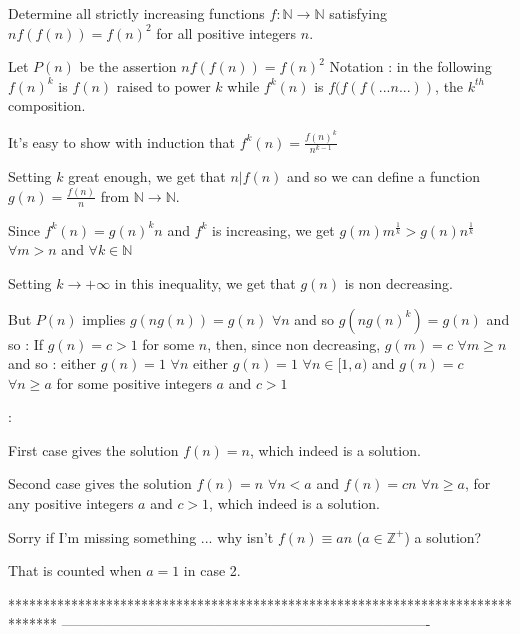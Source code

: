 \begin{solution}
	\begin{tcolorbox}Determine all strictly increasing functions $f: \mathbb{N}\to\mathbb{N}$ satisfying $nf(f(n))=f(n)^2$ for all positive integers $n$.\end{tcolorbox}
Let $P(n)$ be the assertion $nf(f(n))=f(n)^2$
Notation : in the following $f(n)^k$ is $f(n)$ raised to power $k$ while $f^{k}(n)$ is $f(f(f(... n ...))$, the $k^{th}$ composition.

It's easy to show with induction that $f^{k}(n)=\frac{f(n)^k}{n^{k-1}}$

Setting $k$ great enough, we get that $n|f(n)$ and so we can define a function $g(n)=\frac{f(n)}n$ from $\mathbb N\to\mathbb N$.

Since $f^{k}(n)=g(n)^kn$ and $f^{k}$ is increasing, we get $g(m)m^{\frac 1k}>g(n)n^{\frac 1k}$ $\forall m>n$ and $\forall k\in\mathbb N$

Setting $k\to+\infty$ in this inequality, we get that $g(n)$ is non decreasing.

But $P(n)$ implies $g(ng(n))=g(n)$ $\forall n$ and so $g(ng(n)^k)=g(n)$ and so :
If $g(n)=c>1$ for some $n$, then, since non decreasing, $g(m)=c$ $\forall m\ge n$ and so :
either $g(n)=1$ $\forall n$
either $g(n)=1$ $\forall n\in[1,a)$ and $g(n)=c$ $\forall n\ge a$ for some positive integers $a$ and $c>1$

 :

First case gives the solution $f(n)=n$, which indeed is a solution.

Second case gives the solution $f(n)=n$ $\forall n< a$ and $f(n)=cn$ $\forall n\ge a$, for any positive integers $a$ and $c>1$, which indeed is a solution.
\end{solution}



\begin{solution}
	Sorry if I'm missing something ... why isn't $f(n) \equiv an$ ($a \in \mathbb{Z}^+$) a solution?
\end{solution}



\begin{solution}
	That is counted when $a=1$ in case 2.
\end{solution}
*******************************************************************************
-------------------------------------------------------------------------------

